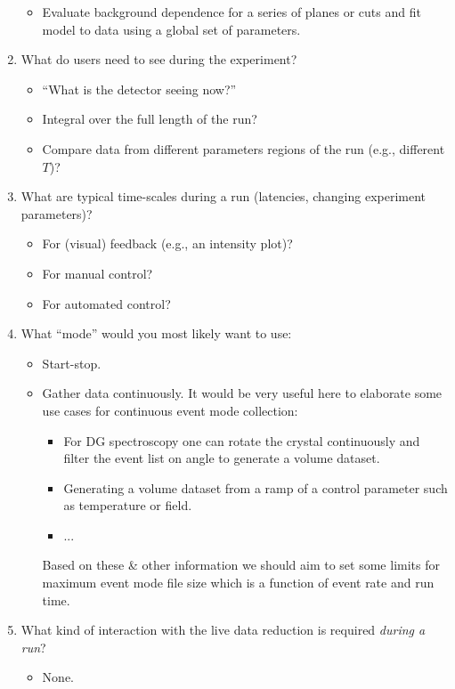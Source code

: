 \documentclass[a4paper,english,numbers=noenddot,bibliography=totoc,chapterprefix=on,DIV=12]{scrartcl}
\begin{document}
\begin{enumerate}
{\begin{itemize}
      \item Evaluate background dependence for a series of planes or cuts and fit model to data using a global set of parameters.
    \end{itemize}
  }
  \item What do users need to see during the experiment?
    \begin{itemize}
      \item ``What is the detector seeing now?''
      \item Integral over the full length of the run?
      \item Compare data from different parameters regions of the run (e.g., different $T$)?
    \end{itemize}
  \item What are typical time-scales during a run (latencies, changing experiment parameters)?
    \begin{itemize}
      \item For (visual) feedback (e.g., an intensity plot)?
      \item For manual control?
      \item For automated control?
    \end{itemize}
  \item What ``mode'' would you most likely want to use:
    \begin{itemize}
      \item Start-stop.
      \item Gather data continuously.
        It would be very useful here to elaborate some use cases for continuous event mode collection:
        \begin{itemize}
          \item For DG spectroscopy one can rotate the crystal continuously and filter the event list on angle to generate a volume dataset.
          \item Generating a volume dataset from a ramp of a control parameter such as temperature or field.
          \item ...
        \end{itemize}
        Based on these \& other information we should aim to set some limits for maximum event mode file size which is a function of event rate and run time.
    \end{itemize}
  \item What kind of interaction with the live data reduction is required \emph{during a run}?
    \begin{itemize}
      \item None.

\end{itemize}
\end{enumerate}
\end{document}
